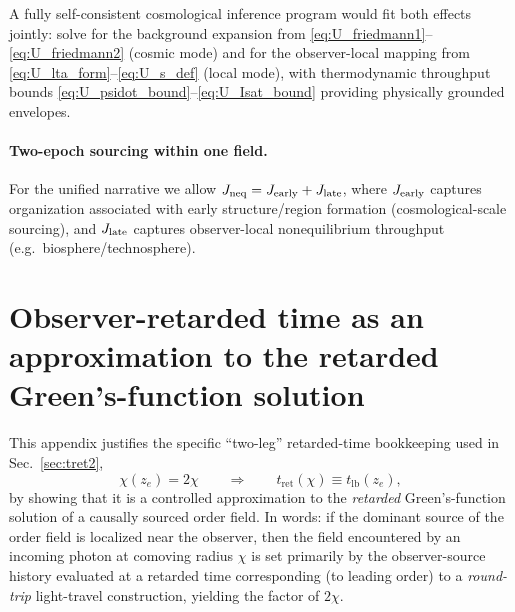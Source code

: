 \documentclass[10pt]{article}
\newcommand{\chis}{\chi}
\newcommand{\tret}{t_{\mathrm{ret}}}
\newcommand{\tlb}{t_{\mathrm{lb}}}
\begin{document}
A fully self-consistent cosmological inference program would fit both effects jointly:
solve for the background expansion from \eqref{eq:U_friedmann1}--\eqref{eq:U_friedmann2} (cosmic mode)
and for the observer-local mapping from \eqref{eq:U_lta_form}--\eqref{eq:U_s_def} (local mode),
with thermodynamic throughput bounds \eqref{eq:U_psidot_bound}--\eqref{eq:U_Isat_bound} providing physically grounded envelopes.

\paragraph{Two-epoch sourcing within one field.}
For the unified narrative we allow
$J_{\rm neq}=J_{\rm early}+J_{\rm late}$, where $J_{\rm early}$ captures
organization associated with early structure/region formation (cosmological-scale sourcing),
and $J_{\rm late}$ captures observer-local nonequilibrium throughput (e.g.\ biosphere/technosphere).


%

\section{Observer-retarded time as an approximation to the retarded Green's-function solution}
\label{app:tret_green}

This appendix justifies the specific ``two-leg'' retarded-time bookkeeping used in
Sec.~\ref{sec:tret2},
\begin{equation}
\chis(z_e)=2\chis
\qquad\Rightarrow\qquad
\tret(\chis)\equiv \tlb(z_e),
\label{eq:V_tret_def_recall}
\end{equation}
by showing that it is a controlled approximation to the \emph{retarded} Green's-function solution
of a causally sourced order field. In words: if the dominant source of the order field is localized
near the observer, then the field encountered by an incoming photon at comoving radius $\chis$ is
set primarily by the observer-source history evaluated at a retarded time corresponding (to leading
order) to a \emph{round-trip} light-travel construction, yielding the factor of $2\chis$.
\end{document}
